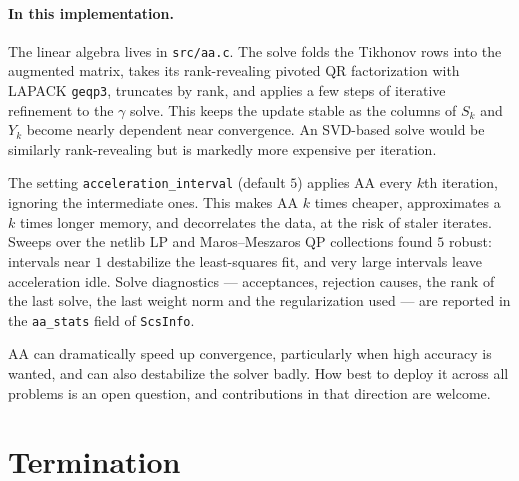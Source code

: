 \documentclass[11pt,a4paper]{article}
\theoremstyle{plain}
\begin{document}
\paragraph{In this implementation.} The linear algebra lives in
\texttt{src/aa.c}. The solve folds the Tikhonov rows into the
augmented matrix, takes its rank-revealing pivoted QR factorization with LAPACK
\texttt{geqp3}, truncates by rank, and applies a few steps of iterative
refinement to the $\gamma$ solve. This keeps the update stable as the columns of $S_k$ and $Y_k$
become nearly dependent near convergence. An SVD-based solve would be
similarly rank-revealing but is markedly more expensive per iteration.

The setting \texttt{acceleration\_interval} (default $5$) applies AA every
$k$th iteration, ignoring the intermediate ones. This makes AA $k$ times
cheaper, approximates a $k$ times longer memory, and decorrelates the data,
at the risk of staler iterates. Sweeps over the netlib LP and Maros--Meszaros
QP collections found $5$ robust: intervals near $1$ destabilize the
least-squares fit, and very large intervals leave acceleration idle. Solve
diagnostics --- acceptances, rejection causes, the rank of the last solve, the
last weight norm and the regularization used --- are reported in the
\texttt{aa\_stats} field of \texttt{ScsInfo}.

AA can dramatically speed up convergence, particularly when high accuracy is
wanted, and can also destabilize the solver badly. How best to deploy it
across all problems is an open question, and contributions in that direction
are welcome.

\section{Termination}\label{sec:term}
\end{document}
